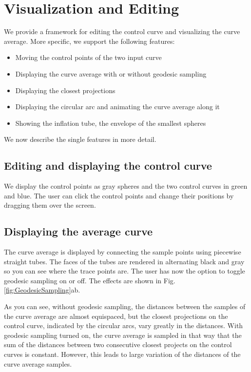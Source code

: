 \documentclass[journal, letterpaper]{IEEEtran}
\begin{document}
\section{Visualization and Editing}\label{chapter:Visual}

We provide a framework for editing the control curve and visualizing the curve average.
More specific, we support the following features: 
\begin{itemize}
	\item Moving the control points of the two input curve
	\item Displaying the curve average with or without geodesic sampling
	\item Displaying the closest projections
	\item Displaying the circular arc and animating the curve average along it
	\item Showing the inflation tube, the envelope of the smallest spheres
\end{itemize}
We now describe the single features in more detail.

\subsection{Editing and displaying the control curve}
We display the control points as gray spheres and the two control curves in green and blue.
The user can click the control points and change their positions by dragging them over the screen.

\subsection{Displaying the average curve}
The curve average is displayed by connecting the sample points using piecewise straight tubes. The faces of the tubes are rendered in alternating black and gray so you can see where the trace points are.
The user has now the option to toggle geodesic sampling on or off. The effects are shown in Fig.\ref{fig:GeodesicSampling}ab. 

As you can see, without geodesic sampling, the distances between the samples of the curve average are almost equispaced, but the closest projections on the control curve, indicated by the circular arcs, vary greatly in the distances. With geodesic sampling turned on, the curve average is sampled in that way that the sum of the distances between two consecutive closest projects on the control curves is constant. However, this leads to large variation of the distances of the curve average samples.
\end{document}

